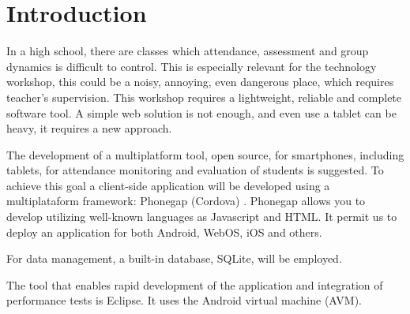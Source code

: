 \chapter{Introduction}
In a high school, there are classes which attendance, assessment and group dynamics is difficult to control.
This is especially relevant for the technology workshop, this could be a noisy, annoying, even dangerous place, which requires teacher's supervision. This workshop requires a lightweight,
reliable and complete  software tool. A simple web solution is not enough, and even use a tablet can be heavy, it requires a new approach.
  
The development of a multiplatform tool, open source, for smartphones, including tablets, for attendance monitoring and evaluation of students is suggested.
 To achieve this goal a client-side application will be developed using a multiplataform framework: Phonegap (Cordova) \cite{PhoneGap}.
Phonegap allows you to develop utilizing well-known languages as Javascript and HTML. It permit us to deploy an application for both Android,
WebOS, iOS and others.    

For data management, a built-in database, SQLite, will be employed.
  
The tool that enables rapid development of the application and integration of performance tests is Eclipse. It uses the Android virtual machine (AVM).
